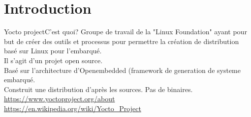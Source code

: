 \section{Introduction}

\begin{frame}{Yocto project}{C'est quoi?}
	Groupe de travail de la "Linux Foundation" ayant pour but de créer des outils et processus pour permettre la création de distribution basé sur Linux pour l'embarqué.\\
	Il s'agit d'un projet open source.\\
	Basé sur l'architecture d'Openembedded (framework de generation de systeme embarqué.\\
	Construit une distribution d'après les sources. Pas de binaires.\\
	\url{https://www.yoctoproject.org/about}\\
	\url{https://en.wikipedia.org/wiki/Yocto_Project}\\
\end{frame}

